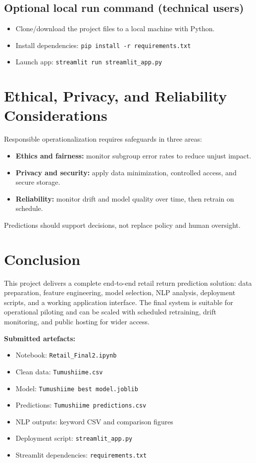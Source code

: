 \documentclass[11pt,a4paper]{article}
\begin{document}
\subsection{Optional local run command (technical users)}
\begin{itemize}[leftmargin=1.5em]
    \item Clone/download the project files to a local machine with Python.
    \item Install dependencies: \texttt{pip install -r requirements.txt}
    \item Launch app: \texttt{streamlit run streamlit\_app.py}
\end{itemize}

\section{Ethical, Privacy, and Reliability Considerations}
Responsible operationalization requires safeguards in three areas:
\begin{itemize}[leftmargin=1.5em]
    \item \textbf{Ethics and fairness:} monitor subgroup error rates to reduce unjust impact.
    \item \textbf{Privacy and security:} apply data minimization, controlled access, and secure storage.
    \item \textbf{Reliability:} monitor drift and model quality over time, then retrain on schedule.
\end{itemize}

Predictions should support decisions, not replace policy and human oversight.

\section{Conclusion}
This project delivers a complete end-to-end retail return prediction solution: data preparation, feature engineering, model selection, NLP analysis, deployment scripts, and a working application interface. The final system is suitable for operational piloting and can be scaled with scheduled retraining, drift monitoring, and public hosting for wider access.

\vspace{1em}
\textbf{Submitted artefacts:}
\begin{itemize}[leftmargin=1.5em]
    \item Notebook: \texttt{Retail\_Final2.ipynb}
    \item Clean data: \texttt{Tumushiime.csv}
    \item Model: \texttt{Tumushiime best model.joblib}
    \item Predictions: \texttt{Tumushiime predictions.csv}
    \item NLP outputs: keyword CSV and comparison figures
    \item Deployment script: \texttt{streamlit\_app.py}
    \item Streamlit dependencies: \texttt{requirements.txt}
\end{itemize}
\end{document}
